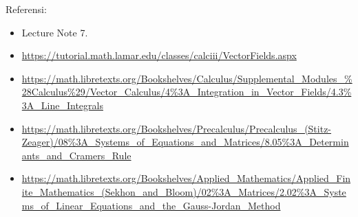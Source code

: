 \documentclass[a4paper]{article}
\begin{document}
Referensi:

\begin{itemize}
  \item Lecture Note 7.
  \item \url{https://tutorial.math.lamar.edu/classes/calciii/VectorFields.aspx}
  \item \url{https://math.libretexts.org/Bookshelves/Calculus/Supplemental_Modules_%28Calculus%29/Vector_Calculus/4%3A_Integration_in_Vector_Fields/4.3%3A_Line_Integrals}
  \item \url{https://math.libretexts.org/Bookshelves/Precalculus/Precalculus_(Stitz-Zeager)/08%3A_Systems_of_Equations_and_Matrices/8.05%3A_Determinants_and_Cramers_Rule}
  \item \url{https://math.libretexts.org/Bookshelves/Applied_Mathematics/Applied_Finite_Mathematics_(Sekhon_and_Bloom)/02%3A_Matrices/2.02%3A_Systems_of_Linear_Equations_and_the_Gauss-Jordan_Method}
\end{itemize}
\end{document}
